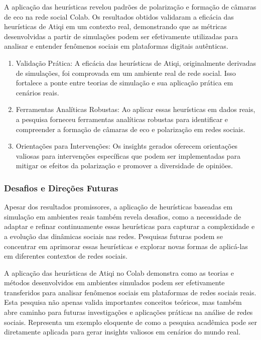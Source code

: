 A aplicação das heurísticas revelou padrões de polarização e formação de câmaras de eco na rede social Colab. Os resultados obtidos validaram a eficácia das heurísticas de Atiqi em um contexto real, demonstrando que as métricas desenvolvidas a partir de simulações podem ser efetivamente utilizadas para analisar e entender fenômenos sociais em plataformas digitais autênticas.

\begin{enumerate}
	\item Validação Prática: A eficácia das heurísticas de Atiqi, originalmente derivadas de simulações, foi comprovada em um ambiente real de rede social. Isso fortalece a ponte entre teorias de simulação e sua aplicação prática em cenários reais.
	\item Ferramentas Analíticas Robustas: Ao aplicar essas heurísticas em dados reais, a pesquisa forneceu ferramentas analíticas robustas para identificar e compreender a formação de câmaras de eco e polarização em redes sociais.
	\item Orientações para Intervenções: Os insights gerados oferecem orientações valiosas para intervenções específicas que podem ser implementadas para mitigar os efeitos da polarização e promover a diversidade de opiniões.
\end{enumerate}

\subsubsection*{Desafios e Direções Futuras}

Apesar dos resultados promissores, a aplicação de heurísticas baseadas em simulação em ambientes reais também revela desafios, como a necessidade de adaptar e refinar continuamente essas heurísticas para capturar a complexidade e a evolução das dinâmicas sociais nas redes. Pesquisas futuras podem se concentrar em aprimorar essas heurísticas e explorar novas formas de aplicá-las em diferentes contextos de redes sociais.

A aplicação das heurísticas de Atiqi no Colab demonstra como as teorias e métodos desenvolvidos em ambientes simulados podem ser efetivamente transferidos para analisar fenômenos sociais em plataformas de redes sociais reais. Esta pesquisa não apenas valida importantes conceitos teóricos, mas também abre caminho para futuras investigações e aplicações práticas na análise de redes sociais. Representa um exemplo eloquente de como a pesquisa acadêmica pode ser diretamente aplicada para gerar insights valiosos em cenários do mundo real.

